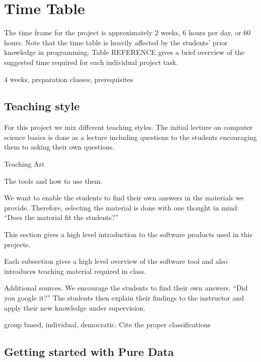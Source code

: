 \documentclass[onecolumn,nocopyrightspace,preprint]{sigplanconf}
\begin{document}
\section{Time Table}

The time frame for the project is approximately 2 weeks, 6 hours per day, or
60 hours. Note that the time table is heavily affected by the students' prior
knowledge in programming. Table REFERENCE gives a brief overview of the
suggested time required for each individual project task.






4 weeks, preparation classes, prerequisites


\subsection{Teaching style}

For this project we mix different teaching styles. The initial lecture on
computer science basics is done as a lecture including questions to the
students encouraging them to asking their own questions.


Teaching Art~\cite{book:Peez2008}

The tools and how to use them.

We want to enable the students to find their own answers in the materials
we provide. Therefore, selecting the material is done with one thought
in mind: ``Does the material fit the students?''

This section gives a high level introduction to the software products
used in this projects.

Each subsection gives a high level overview of the software tool and
also introduces teaching material required in class.

Additional sources. We encourage the students to find their own answers.
``Did you google it?''
The students then explain their findings to the instructor and apply their
new knowledge under supervision.


group based, individual, democratic. Cite the proper classifications~\cite{book:Hubwieser2007}





\subsection{Getting started with Pure Data}


\end{document}

